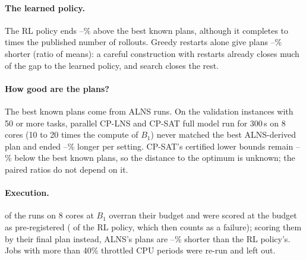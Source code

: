 \paragraph{The learned policy.} The RL policy ends \Gaprllo--\Gaprlhi\% above the best known plans, although it
completes \RLNlo{} to \RLNhi{} times the published number of rollouts. Greedy restarts alone give plans
\RestartsRLlo--\RestartsRLhi\% shorter (ratio of means): a careful construction with restarts already closes much of
the gap to the learned policy, and search closes the rest.

\paragraph{How good are the plans?} The best known plans come from ALNS runs. On the \RefValInstances{} validation
instances with 50 or more tasks, parallel CP-LNS and CP-SAT full model run for 300\,s on 8 cores (10 to 20 times the
compute of $B_1$) never matched the best ALNS-derived plan and ended \RefValFreelo--\RefValFreehi\% longer per setting. CP-SAT's certified lower bounds remain
\RefValBoundlo--\RefValBoundhi\% below the best known plans, so the distance to the optimum is unknown; the paired
ratios do not depend on it.

\paragraph{Execution.} \LateBone{} of the \RunsBone{} runs on 8 cores at $B_1$ overran their budget and were scored
at the budget as pre-registered (\LateRL{} of the RL policy, which then counts as a failure); scoring them by their final
plan instead, ALNS's plans are \Sensrlgainlo--\Sensrlgainhi\% shorter than the RL policy's. Jobs with more than 40\%
throttled CPU periods were re-run and left out.

